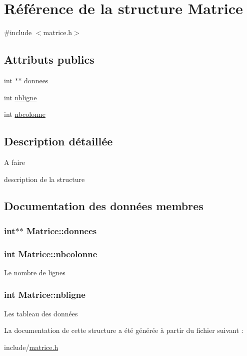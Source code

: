 \hypertarget{structMatrice}{\section{\-Référence de la structure \-Matrice}
\label{structMatrice}
}


{\ttfamily \#include $<$matrice.\-h$>$}

\subsection*{\-Attributs publics}
\begin{DoxyCompactItemize}
\item 
int $\ast$$\ast$ \hyperlink{structMatrice_a4ed59291b88d3ed8b30b3f74d4acf6b3}{donnees}
\item 
int \hyperlink{structMatrice_a27d7f184cab0fce2a40e173afca96f9f}{nbligne}
\item 
int \hyperlink{structMatrice_a7bf8157909d60e8ff841b26fc5cb2bab}{nbcolonne}
\end{DoxyCompactItemize}


\subsection{\-Description détaillée}
\begin{DoxyRefDesc}{\-A faire}
\item[\hyperlink{todo__todo000001}{\-A faire}]description de la structure \end{DoxyRefDesc}


\subsection{\-Documentation des données membres}
\hypertarget{structMatrice_a4ed59291b88d3ed8b30b3f74d4acf6b3}{
\subsubsection[{donnees}]{\setlength{\rightskip}{0pt plus 5cm}int$\ast$$\ast$ {\bf \-Matrice\-::donnees}}}\label{structMatrice_a4ed59291b88d3ed8b30b3f74d4acf6b3}
\hypertarget{structMatrice_a7bf8157909d60e8ff841b26fc5cb2bab}{
\subsubsection[{nbcolonne}]{\setlength{\rightskip}{0pt plus 5cm}int {\bf \-Matrice\-::nbcolonne}}}\label{structMatrice_a7bf8157909d60e8ff841b26fc5cb2bab}
\-Le nombre de lignes \hypertarget{structMatrice_a27d7f184cab0fce2a40e173afca96f9f}{
\subsubsection[{nbligne}]{\setlength{\rightskip}{0pt plus 5cm}int {\bf \-Matrice\-::nbligne}}}\label{structMatrice_a27d7f184cab0fce2a40e173afca96f9f}
\-Les tableau des données 

\-La documentation de cette structure a été générée à partir du fichier suivant \-:\begin{DoxyCompactItemize}
\item 
include/\hyperlink{matrice_8h}{matrice.\-h}\end{DoxyCompactItemize}
